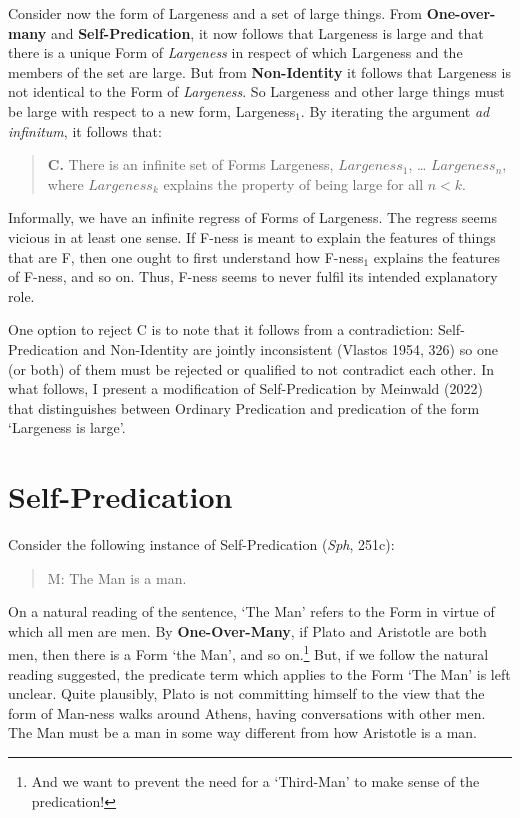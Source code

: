 \noindent Consider now the form of Largeness and a set of large things. From \textbf{One-over-many} and \textbf{Self-Predication}, it now follows that Largeness is large and that there is a unique Form of \textit{Largeness} in respect of which Largeness and the members of the set are large. But from \textbf{Non-Identity} it follows that Largeness is not identical to the Form of \textit{Largeness}. So Largeness and other large things must be large with respect to a new form, Largeness$_1$. By iterating the argument \textit{ad infinitum}, it follows that:

\begin{quote}
\textbf{C.} There is an infinite set of Forms {Largeness, $Largeness_1$, … $Largeness_n$}, where $Largeness_k$ explains the property of being large for all $n<k$. 
\end{quote}

\noindent Informally, we have an infinite regress of Forms of Largeness. The regress seems vicious in at least one sense. If F-ness is meant to explain the features of things that are F, then one ought to first understand how F-ness$_1$ explains the features of F-ness, and so on. Thus, F-ness seems to never fulfil its intended explanatory role. 

One option to reject C is to note that it follows from a contradiction: Self-Predication and Non-Identity are jointly inconsistent (Vlastos 1954, 326) so one (or both) of them must be rejected or qualified to not contradict each other. In what follows, I present a modification of Self-Predication by Meinwald (2022) that distinguishes between Ordinary Predication and predication of the form `Largeness is large'.

\section{Self-Predication}

Consider the following instance of Self-Predication (\textit{Sph}, 251c): 
\begin{quote}
M: The Man is a man.
\end{quote}

\noindent On a natural reading of the sentence, `The Man’ refers to the Form in virtue of which all men are men. By \textbf{One-Over-Many}, if Plato and Aristotle are both men, then there is a Form `the Man’, and so on.\footnote{And we want to prevent the need for a  `Third-Man' to make sense of the predication!} But, if we follow the natural reading suggested, the predicate term which applies to the Form `The Man’ is left unclear. Quite plausibly, Plato is not committing himself to the view that the form of Man-ness walks around Athens, having conversations with other men. The Man must be a man in some way different from how Aristotle is a man. 


